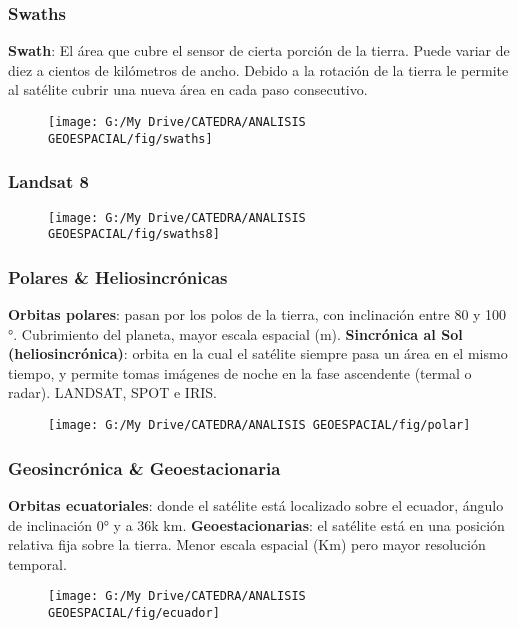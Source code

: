 \documentclass[14pt]{beamer}
\begin{document}
\begin{frame}
\frametitle{Swaths} 
\scriptsize{
\textbf{Swath}: El área que cubre el sensor de cierta porción de la tierra. Puede variar de diez a cientos de kilómetros de ancho. Debido a la rotación de la tierra le permite al satélite cubrir una nueva área en cada paso consecutivo.
}
 \begin{figure}
    \centering
    \texttt{[image: G:/My Drive/CATEDRA/ANALISIS GEOESPACIAL/fig/swaths]}
  \end{figure}
\end{frame}
\begin{frame}
\frametitle{Landsat 8}
 \begin{figure}
    \centering
    \texttt{[image: G:/My Drive/CATEDRA/ANALISIS GEOESPACIAL/fig/swaths8]}
  \end{figure}
\end{frame}
 \begin{frame}
\frametitle{Polares \& Heliosincrónicas}
\scriptsize{
\textbf{Orbitas polares}: pasan por los polos de la tierra, con inclinación entre 80 y 100 °. Cubrimiento del planeta, mayor escala espacial (m).\vfill
\textbf{Sincrónica al Sol (heliosincrónica)}: orbita en la cual el satélite siempre pasa un área en el mismo tiempo, y permite tomas imágenes de noche en la fase ascendente (termal o radar). LANDSAT, SPOT e IRIS.
}
 \begin{figure}
    \centering
    \texttt{[image: G:/My Drive/CATEDRA/ANALISIS GEOESPACIAL/fig/polar]}
  \end{figure}
\end{frame}
 \begin{frame}
\frametitle{Geosincrónica \& Geoestacionaria}
\scriptsize{
\textbf{Orbitas ecuatoriales}: donde el satélite está localizado sobre el ecuador, ángulo de inclinación 0° y a 36k km.\vfill
\textbf{Geoestacionarias}: el satélite está en una posición relativa fija sobre la tierra. Menor escala espacial (Km) pero mayor resolución temporal.
}
 \begin{figure}
    \centering
    \texttt{[image: G:/My Drive/CATEDRA/ANALISIS GEOESPACIAL/fig/ecuador]}
  \end{figure}
\end{frame}
\end{document}
